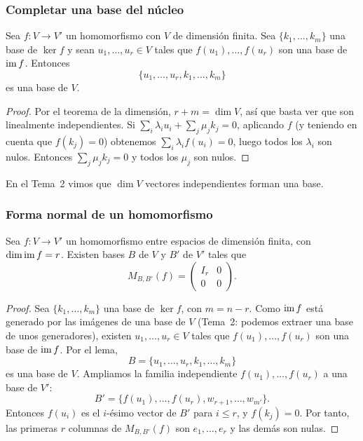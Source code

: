 \begin{frame}
    \frametitle{Completar una base del núcleo}

    \begin{lemma}
        Sea $f\colon V\to V'$ un homomorfismo con $V$ de dimensión finita.
        Sea $\{k_1,\ldots,k_m\}$ una base de $\ker f$ y sean
        $u_1,\ldots,u_r\in V$ tales que $f(u_1),\ldots,f(u_r)$ son una
        base de $\operatorname{im} f$. Entonces
        \[
            \{u_1,\ldots,u_r,k_1,\ldots,k_m\}
        \]
        es una base de $V$.
    \end{lemma}

    \begin{proof}
        Por el teorema de la dimensión, $r+m=\dim V$, así que basta ver que
        son linealmente independientes. Si
        $\sum_i\lambda_iu_i+\sum_j\mu_jk_j=0$, aplicando $f$ (y teniendo
        en cuenta que $f(k_j)=0$) obtenemos $\sum_i\lambda_if(u_i)=0$,
        luego todos los $\lambda_i$ son nulos. Entonces
        $\sum_j\mu_jk_j=0$ y todos los $\mu_j$ son nulos.
    \end{proof}

    \medskip

    En el Tema~2 vimos que $\dim V$ vectores independientes forman una
    base.
\end{frame}


\begin{frame}[allowframebreaks, t]
    \frametitle{Forma normal de un homomorfismo}

    \begin{theorem}
        Sea $f\colon V\to V'$ un homomorfismo entre espacios de dimensión
        finita, con $\dim\operatorname{im} f=r$. Existen bases $B$ de $V$ y $B'$ de $V'$ tales
        que
        \[
            M_{B,B'}(f)=\left(
            \begin{array}{c|c}
                I_r&0\\\hline0&0
            \end{array}
            \right).
        \]
    \end{theorem}

    \framebreak

    \begin{proof}
        Sea $\{k_1,\ldots,k_m\}$ una base de $\ker f$, con $m=n-r$.
        Como $\operatorname{im} f$ está generado por las imágenes de una base de $V$
        (Tema~2: podemos extraer una base de unos generadores), existen
        $u_1,\ldots,u_r\in V$ tales que $f(u_1),\ldots,f(u_r)$ son una base
        de $\operatorname{im} f$. Por el lema,
        \[
            B=\{u_1,\ldots,u_r,k_1,\ldots,k_m\}
        \]
        es una base de $V$. Ampliamos la familia independiente
        $f(u_1),\ldots,f(u_r)$ a una base de $V'$:
        \[
            B'=\{f(u_1),\ldots,f(u_r),w_{r+1},\ldots,w_{m'}\}.
        \]
        Entonces $f(u_i)$ es el $i$-ésimo vector de $B'$ para $i\leq r$, y
        $f(k_j)=0$. Por tanto, las primeras $r$ columnas de $M_{B,B'}(f)$ son
        $e_1,\ldots,e_r$ y las demás son nulas.
    \end{proof}
\end{frame}


